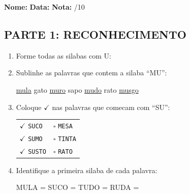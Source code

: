 \begin{exercicio}
\noindent\textbf{Nome:} \underline{\hspace{3.2cm}} \quad \textbf{Data:} \underline{\hspace{1.6cm}} \quad \textbf{Nota:} \underline{\hspace{0.9cm}}/10

\subsection*{PARTE 1: RECONHECIMENTO}

\begin{enumerate}
  \item Forme todas as silabas com U:
  \begin{center}
  \end{center}

  \item Sublinhe as palavras que contem a silaba ``MU'':
  \begin{center}
  \uline{mula} \quad gato \quad \uline{muro} \quad sapo \quad \uline{mudo} \quad rato \quad \uline{musgo}
  \end{center}

  \item Coloque $\checkmark$ nas palavras que comecam com ``SU'':
  \begin{center}
  \begin{tabular}{ll}
  $\checkmark$ \texttt{SUCO} & $\square$ \texttt{MESA} \\
  $\checkmark$ \texttt{SUMO} & $\square$ \texttt{TINTA} \\
  $\checkmark$ \texttt{SUSTO} & $\square$ \texttt{RATO}
  \end{tabular}
  \end{center}

  \item Identifique a primeira silaba de cada palavra:
  \begin{center}
  MULA = \underline{\hspace{1cm}} \quad SUCO = \underline{\hspace{1cm}} \quad TUDO = \underline{\hspace{1cm}} \quad RUDA = \underline{\hspace{1cm}}
  \end{center}


\end{enumerate}
\end{exercicio}

